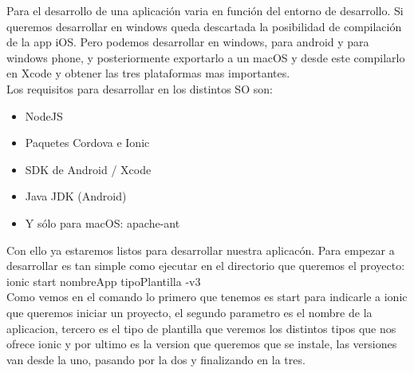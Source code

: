 \documentclass[a4paper, 11pt]{article}
\begin{document}
\begin{itemize}
            Para el desarrollo de una aplicación varia en función del entorno de
            desarrollo. Si queremos desarrollar en windows queda descartada la
            posibilidad de compilación de la app iOS. Pero podemos desarrollar en
            windows, para android y para windows phone, y posteriormente exportarlo
            a un macOS y desde este compilarlo en Xcode y obtener las tres
            plataformas mas importantes.\\

            Los requisitos para desarrollar en los distintos SO son:
            \begin{itemize}
                \item{NodeJS}
                \item{Paquetes Cordova e Ionic}
                \item{SDK de Android / Xcode}
                \item{Java JDK (Android)}
                \item{Y sólo para macOS: apache-ant}
            \end{itemize}

            Con ello ya estaremos listos para desarrollar nuestra aplicacón. Para
            empezar a desarrollar es tan simple como ejecutar en el directorio que
            queremos el proyecto: ionic start nombreApp tipoPlantilla -v3\\

            Como vemos en el comando lo primero que tenemos es start para indicarle
            a ionic que queremos iniciar un proyecto, el segundo parametro es el
            nombre de la aplicacion, tercero es el tipo de plantilla que veremos los
            distintos tipos que nos ofrece ionic y por ultimo es la version que
            queremos que se instale, las versiones van desde la uno, pasando por la
            dos y finalizando en la tres.



\end{itemize}
\end{document}

